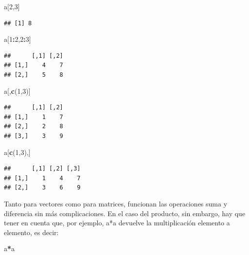 \documentclass[
]{book}
\newenvironment{Shaded}{\begin{snugshade}}{\end{snugshade}}
\newcommand{\DecValTok}[1]{\textcolor[rgb]{0.00,0.00,0.81}{#1}}
\newcommand{\FunctionTok}[1]{\textcolor[rgb]{0.13,0.29,0.53}{\textbf{#1}}}
\newcommand{\NormalTok}[1]{#1}
\newcommand{\SpecialCharTok}[1]{\textcolor[rgb]{0.81,0.36,0.00}{\textbf{#1}}}
\begin{document}
\begin{Shaded}
\begin{Highlighting}[]
\NormalTok{a[}\DecValTok{2}\NormalTok{,}\DecValTok{3}\NormalTok{]}
\end{Highlighting}
\end{Shaded}

\begin{verbatim}
## [1] 8
\end{verbatim}

\begin{Shaded}
\begin{Highlighting}[]
\NormalTok{a[}\DecValTok{1}\SpecialCharTok{:}\DecValTok{2}\NormalTok{,}\DecValTok{2}\SpecialCharTok{:}\DecValTok{3}\NormalTok{] }
\end{Highlighting}
\end{Shaded}

\begin{verbatim}
##      [,1] [,2]
## [1,]    4    7
## [2,]    5    8
\end{verbatim}

\begin{Shaded}
\begin{Highlighting}[]
\NormalTok{a[,}\FunctionTok{c}\NormalTok{(}\DecValTok{1}\NormalTok{,}\DecValTok{3}\NormalTok{)]}
\end{Highlighting}
\end{Shaded}

\begin{verbatim}
##      [,1] [,2]
## [1,]    1    7
## [2,]    2    8
## [3,]    3    9
\end{verbatim}

\begin{Shaded}
\begin{Highlighting}[]
\NormalTok{a[}\FunctionTok{c}\NormalTok{(}\DecValTok{1}\NormalTok{,}\DecValTok{3}\NormalTok{),]}
\end{Highlighting}
\end{Shaded}

\begin{verbatim}
##      [,1] [,2] [,3]
## [1,]    1    4    7
## [2,]    3    6    9
\end{verbatim}

Tanto para vectores como para matrices, funcionan las operaciones suma y diferencia sin más complicaciones. En el caso del producto, sin embargo, hay que tener en cuenta que, por ejemplo, a*a devuelve la multiplicación elemento a elemento, es decir:

\begin{Shaded}
\begin{Highlighting}[]
\NormalTok{a}\SpecialCharTok{*}\NormalTok{a}
\end{Highlighting}
\end{Shaded}
\end{document}
